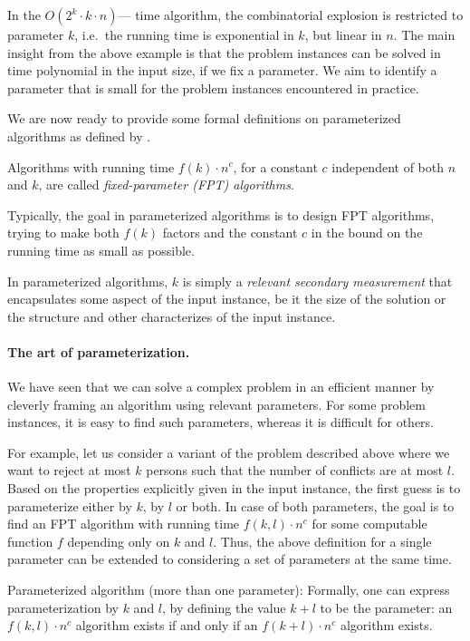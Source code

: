 In the $O(2^k \cdot k \cdot n)$--- time algorithm, the combinatorial explosion is restricted to parameter $k$, i.e.\, the running time is exponential in $k$, but linear in $n$.
The main insight from the above example is that the problem instances can be solved in time polynomial in the input size, if we fix a parameter. 
We aim to identify a parameter that is small for the problem instances encountered in practice.

We are now ready to provide some formal definitions on parameterized algorithms as defined by \cite{cygan2015parameterized}.

\begin{definition}
 Algorithms with running time $f(k)\cdot n^c$, for a constant $c$ independent of both $n$ and $k$, are called \textit{fixed-parameter (FPT) algorithms}.
 \end{definition}
 
  Typically, the goal in parameterized algorithms is to design FPT algorithms, trying to make both $f(k)$ factors 
 and the constant $c$ in the bound on the running time as small as possible. 
 
 In parameterized algorithms, $k$ is simply a \textit{relevant secondary measurement} 
 that encapsulates some aspect of the input instance, be it the size of the solution or the structure and other characterizes of the input instance.


\paragraph{The art of parameterization.}
We have seen that we can solve a complex problem in an efficient manner by cleverly framing an algorithm using relevant parameters.
For some problem instances, it is easy to find such parameters, whereas it is difficult for others.

For example, let us consider a variant of the problem described above where we want to reject at most $k$ persons
such that the number of conflicts are at most $l$.
Based on the properties explicitly given in the input instance, the first guess is to parameterize either by $k$, by $l$ or both. 
In case of both parameters, the goal is to find an FPT algorithm with running time $f(k,l) \cdot n^c$ for some computable function $f$
depending only on $k$ and $l$. Thus, the above definition for a single parameter can be extended to considering a set of parameters at the same time.

Parameterized algorithm (more than one parameter): Formally, one can express parameterization by $k$ and $l$, by defining the value $k+l$ to be the parameter:
an $f(k,l)\cdot n^c$ algorithm exists if and only if an $f(k+l) \cdot n^c$ algorithm exists.

